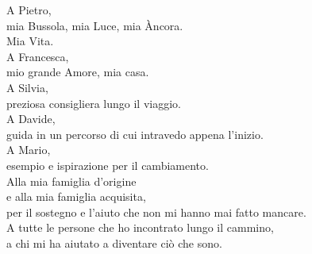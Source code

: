 \begin{flushright}
\begin{minipage}{0.58\textwidth}
\itshape


A Pietro,\\
mia Bussola, mia Luce, mia \`{A}ncora.\\
Mia Vita.\\[0.2cm]

A Francesca,\\
mio grande Amore, mia casa.\\[0.2cm]

A Silvia,\\
preziosa consigliera lungo il viaggio.\\[0.2cm]

A Davide,\\
guida in un percorso di cui intravedo appena l’inizio.\\[0.2cm]

A Mario,\\
esempio e ispirazione per il cambiamento.\\[0.2cm]

Alla mia famiglia d’origine\\
e alla mia famiglia acquisita,\\
per il sostegno e l’aiuto che non mi hanno mai fatto mancare.\\[0.2cm]

A tutte le persone che ho incontrato lungo il cammino,\\
a chi mi ha aiutato a diventare ciò che sono.




\raggedleft
\end{minipage}
\end{flushright}

\vspace*{\fill}

\cleardoublepage